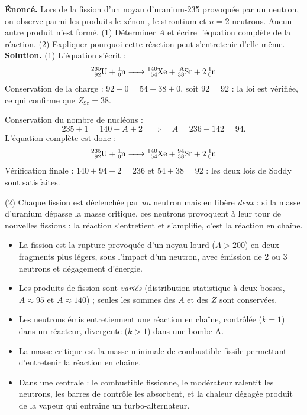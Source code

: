 \documentclass[11pt]{article}
\newcommand{\cle}[1]{{\popxbold\color{popdark}#1}}
\begin{document}
\begin{exoresolu}
\textbf{Énoncé.} Lors de la fission d'un noyau d'uranium-235 provoquée par un neutron, on observe parmi les produits le xénon , le strontium  et $n = 2$ neutrons. Aucun autre produit n'est formé. (1) Déterminer $A$ et écrire l'équation complète de la réaction. (2) Expliquer pourquoi cette réaction peut s'entretenir d'elle-même.
\tcblower
\textbf{Solution.} (1) L'équation s'écrit :
\[
\ce{^{235}_{92}U + ^{1}_{0}n -> ^{140}_{54}Xe + ^{A}_{38}Sr + 2^{1}_{0}n}
\]
Conservation de la charge : $92 + 0 = 54 + 38 + 0$, soit $92 = 92$ : la loi est vérifiée, ce qui confirme que $Z_{\text{Sr}} = 38$.

Conservation du nombre de nucléons :
\[
235 + 1 = 140 + A + 2 \quad\Rightarrow\quad A = 236 - 142 = 94.
\]
L'équation complète est donc :
\[
\ce{^{235}_{92}U + ^{1}_{0}n -> ^{140}_{54}Xe + ^{94}_{38}Sr + 2^{1}_{0}n}
\]
Vérification finale : $140 + 94 + 2 = 236$ et $54 + 38 = 92$ : les deux lois de Soddy sont satisfaites.

(2) Chaque fission est déclenchée par \emph{un} neutron mais en libère \emph{deux} : si la masse d'uranium dépasse la masse critique, ces neutrons provoquent à leur tour de nouvelles fissions : la réaction s'entretient et s'amplifie, c'est la \cle{réaction en chaîne}.
\end{exoresolu}

\begin{aretenir}
\begin{itemize}
\item La \cle{fission} est la rupture provoquée d'un noyau lourd ($A > 200$) en deux fragments plus légers, sous l'impact d'un neutron, avec émission de 2 ou 3 neutrons et dégagement d'énergie.
\item Les produits de fission sont \emph{variés} (distribution statistique à deux bosses, $A \approx 95$ et $A \approx 140$) ; seules les sommes des $A$ et des $Z$ sont conservées.
\item Les neutrons émis entretiennent une \cle{réaction en chaîne}, contrôlée ($k = 1$) dans un réacteur, divergente ($k > 1$) dans une bombe A.
\item La \cle{masse critique} est la masse minimale de combustible fissile permettant d'entretenir la réaction en chaîne.
\item Dans une centrale : le combustible fissionne, le modérateur ralentit les neutrons, les barres de contrôle les absorbent, et la chaleur dégagée produit de la vapeur qui entraîne un turbo-alternateur.
\end{itemize}
\end{aretenir}
\end{document}
